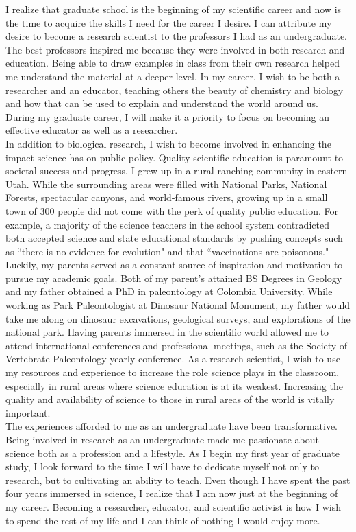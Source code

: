\documentclass[12pt]{report}
\begin{document}
\indent I realize that graduate school is the beginning of my scientific career and now is the time to acquire the skills I need for the career I desire. I can attribute my desire to become a research scientist to the professors I had as an undergraduate. The best professors inspired me because they were involved in both research and education. Being able to draw examples in class from their own research helped me understand the material at a deeper level. In my career, I wish to be both a researcher and an educator, teaching others the beauty of chemistry and biology and how that can be used to explain and understand the world around us. During my graduate career, I will make it a priority to focus on becoming an effective educator as well as a researcher. 
\\
\indent In addition to biological research, I wish to become involved in enhancing the impact science has on public policy. Quality scientific education is paramount to societal success and progress. I grew up in a rural ranching community in eastern Utah. While the surrounding areas were filled with National Parks, National Forests, spectacular canyons, and world-famous rivers, growing up in a small town of 300 people did not come with the perk of quality public education. For example, a majority of the science teachers in the school system contradicted both accepted science and state educational standards by pushing concepts such as ``there is no evidence for evolution" and that ``vaccinations are poisonous." Luckily, my parents served as a constant source of inspiration and motivation to pursue my academic goals. Both of my parent's attained BS Degrees in Geology and my father obtained a PhD in paleontology at Colombia University. While working as Park Paleontologist at Dinosaur National Monument, my father would take me along on dinosaur excavations, geological surveys, and explorations of the national park. Having parents immersed in the scientific world allowed me to attend international conferences and professional meetings, such as the Society of Vertebrate Paleontology yearly conference. As a research scientist, I wish to use my resources and experience to increase the role science plays in the classroom, especially in rural areas where science education is at its weakest.  Increasing the quality and availability of science to those in rural areas of the world is vitally important. 
\\
\indent The experiences afforded to me as an undergraduate have been transformative. Being involved in research as an undergraduate made me passionate about science both as a profession and a lifestyle. As I begin my first year of graduate study, I look forward to the time I will have to dedicate myself not only to research, but to cultivating an ability to teach. Even though I have spent the past four years immersed in science, I realize that I am now just at the beginning of my career. Becoming a researcher, educator, and scientific activist is how I wish to spend the rest of my life and I can think of nothing I would enjoy more. 
\end{document}
